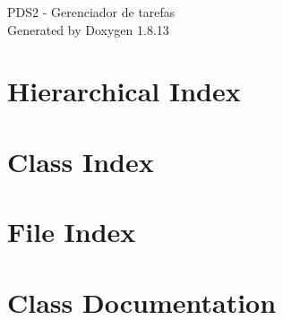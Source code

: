 \documentclass[twoside]{book}
\newcommand{\+}{\discretionary{\mbox{\scriptsize$\hookleftarrow$}}{}{}}
\newcommand{\clearemptydoublepage}{%
  \newpage{\pagestyle{empty}\cleardoublepage}%
}
\begin{document}
\hypersetup{pageanchor=false,
             bookmarksnumbered=true,
             pdfencoding=unicode
            }
\begin{titlepage}
\vspace*{7cm}
\begin{center}%
{\Large P\+D\+S2 -\/ Gerenciador de tarefas }\\
\vspace*{1cm}
{\large Generated by Doxygen 1.8.13}\\
\end{center}
\end{titlepage}
\clearemptydoublepage
{}
\tableofcontents
\clearemptydoublepage
{}
\hypersetup{pageanchor=true}

\chapter{Hierarchical Index}

\chapter{Class Index}

\chapter{File Index}

\chapter{Class Documentation}












































\end{document}
